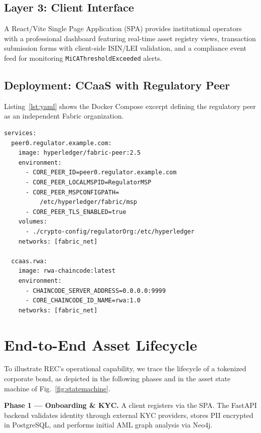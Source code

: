 \documentclass[journal,10pt,twocolumn]{IEEEtran}
\begin{document}
\subsection{Layer 3: Client Interface}

A React/Vite Single Page Application (SPA) provides institutional operators with a professional dashboard featuring real-time asset registry views, transaction submission forms with client-side ISIN/LEI validation, and a compliance event feed for monitoring \texttt{MiCAThresholdExceeded} alerts.

\subsection{Deployment: CCaaS with Regulatory Peer}

Listing~\ref{lst:yaml} shows the Docker Compose excerpt defining the regulatory peer as an independent Fabric organization.

\begin{lstlisting}[style=yamlstyle, caption={Docker Compose: regulatory peer as a separate Fabric organization.}, label={lst:yaml}]
services:
  peer0.regulator.example.com:
    image: hyperledger/fabric-peer:2.5
    environment:
      - CORE_PEER_ID=peer0.regulator.example.com
      - CORE_PEER_LOCALMSPID=RegulatorMSP
      - CORE_PEER_MSPCONFIGPATH=
          /etc/hyperledger/fabric/msp
      - CORE_PEER_TLS_ENABLED=true
    volumes:
      - ./crypto-config/regulatorOrg:/etc/hyperledger
    networks: [fabric_net]

  ccaas.rwa:
    image: rwa-chaincode:latest
    environment:
      - CHAINCODE_SERVER_ADDRESS=0.0.0.0:9999
      - CORE_CHAINCODE_ID_NAME=rwa:1.0
    networks: [fabric_net]
\end{lstlisting}

\section{End-to-End Asset Lifecycle}
\label{sec:usecase}

To illustrate REC's operational capability, we trace the lifecycle of a tokenized corporate bond, as depicted in the following phases and in the asset state machine of Fig.~\ref{fig:statemachine}.

\textbf{Phase 1 --- Onboarding \& KYC.} A client registers via the SPA. The FastAPI backend validates identity through external KYC providers, stores PII encrypted in PostgreSQL, and performs initial AML graph analysis via Neo4j.
\end{document}

